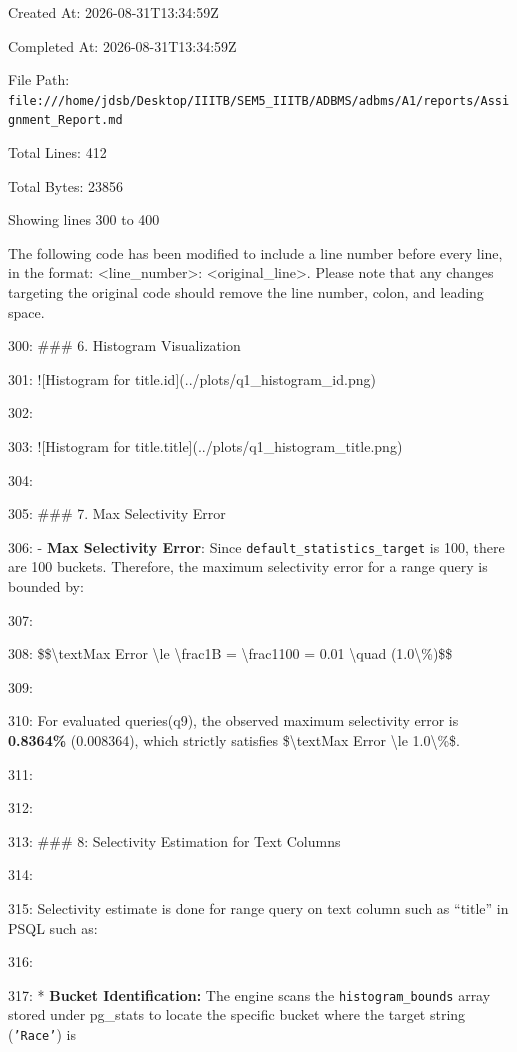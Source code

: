 \documentclass[11pt,a4paper]{article}
\begin{document}
{Created At: 2026-08-31T13:34:59Z

Completed At: 2026-08-31T13:34:59Z

File Path: \texttt{file:///home/jdsb/Desktop/IIITB/SEM5\_IIITB/ADBMS/adbms/A1/reports/Assignment\_Report.md}

Total Lines: 412

Total Bytes: 23856

Showing lines 300 to 400

The following code has been modified to include a line number before every line, in the format: <line\_number>: <original\_line>. Please note that any changes targeting the original code should remove the line number, colon, and leading space.

300: \#\#\# 6. Histogram Visualization

301: ![Histogram for title.id](../plots/q1\_histogram\_id.png)

302:

303: ![Histogram for title.title](../plots/q1\_histogram\_title.png)

304:

305: \#\#\# 7. Max Selectivity Error

306: - \textbf{Max Selectivity Error}: Since \texttt{default\_statistics\_target} is 100, there are 100 buckets. Therefore, the maximum selectivity error for a range query is bounded by:

307:

308: \$\$\textbackslash{}text{Max Error} \textbackslash{}le \textbackslash{}frac{1}{B} = \textbackslash{}frac{1}{100} = 0.01 \textbackslash{}quad (1.0\textbackslash{}\%)\$\$

309:

310: For evaluated queries(q9), the observed maximum selectivity error is \textbf{0.8364\%} (0.008364), which strictly satisfies \$\textbackslash{}text{Max Error} \textbackslash{}le 1.0\textbackslash{}\%\$.

311:

312:

313: \#\#\# 8: Selectivity Estimation for Text Columns

314:

315: Selectivity estimate is done for range query on text column such as “title” in PSQL such as:

316:

317: * \textbf{Bucket Identification:} The engine scans the \texttt{histogram\_bounds} array stored under pg\_stats to locate the specific bucket where the target string (\texttt{'Race'})  is

}
\end{document}
